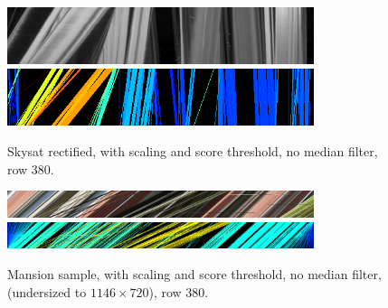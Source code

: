 \documentclass{article}
\def\epiWidth{0.8}
\theoremstyle{definition}
\begin{document}
\begin{figure}[ht]
  \centering
  \includegraphics[width=\epiWidth\textwidth]{images/1520354672022_epi.png}\\
  \includegraphics[width=\epiWidth\textwidth]{images/1520354672022_epi_colored.png}
  \caption{Skysat rectified, with scaling and score threshold, no median filter, row 380.}
  \label{fig:wconf:skysat:380}
\end{figure}


\begin{figure}[ht]
  \centering
  \includegraphics[width=\epiWidth\textwidth]{images/1520354635991_epi.png}\\
  \includegraphics[width=\epiWidth\textwidth]{images/1520354635991_epi_colored.png}
  \caption{Mansion sample, with scaling and score threshold, no median filter, (undersized to $1146\times 720$), row 380.}
  \label{fig:wconf:mansion:380}
\end{figure}
\end{document}
